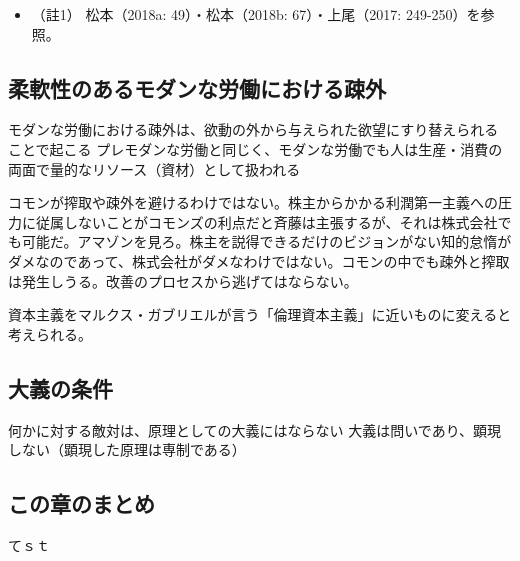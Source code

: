 \begin{itemize}
\tightlist
\item
  （註1） 松本（2018a: 49）\cite{Matsumoto1}・松本（2018b:
  67）\cite{Matsumoto2}・上尾（2017: 249-250）\cite{Ueo}を参照。
\end{itemize}

\subsection{柔軟性のあるモダンな労働における疎外}\label{ux67d4ux8edfux6027ux306eux3042ux308bux30e2ux30c0ux30f3ux306aux52b4ux50cdux306bux304aux3051ux308bux758eux5916}

モダンな労働における疎外は、欲動の外から与えられた欲望にすり替えられることで起こる
\mbox{プレモダン}な労働と同じく、モダンな労働でも人は生産・消費の両面で量的なリソース（資材）として扱われる

コモンが搾取や疎外を避けるわけではない。株主からかかる利潤第一主義への圧力に従属しないことがコモンズの利点だと斉藤は主張するが、それは株式会社でも可能だ。アマゾンを見ろ。株主を説得できるだけのビジョンがない知的怠惰がダメなのであって、株式会社がダメなわけではない。コモンの中でも疎外と搾取は発生しうる。改善のプロセスから逃げてはならない。

資本主義をマルクス・ガブリエルが言う「倫理資本主義」に近いものに変えると考えられる。

\subsection{大義の条件}\label{ux5927ux7fa9ux306eux6761ux4ef6}

何かに対する敵対は、原理としての大義にはならない
大義は問いであり、顕現しない（顕現した原理は専制である）

\subsection{この章のまとめ}\label{ux3053ux306eux7ae0ux306eux307eux3068ux3081}

てｓｔ
